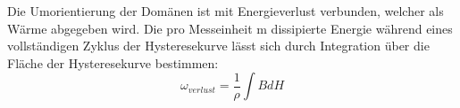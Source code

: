 Die Umorientierung der Domänen ist mit Energieverlust verbunden, welcher als Wärme abgegeben wird.
Die pro Messeinheit m dissipierte Energie während eines vollständigen Zyklus der Hysteresekurve lässt sich durch Integration
über die Fläche der Hysteresekurve bestimmen:
\begin{equation}
    \omega_{verlust} = \frac{1}{\rho}\int B dH
    \label{eq:Energieverlust}
\end{equation}